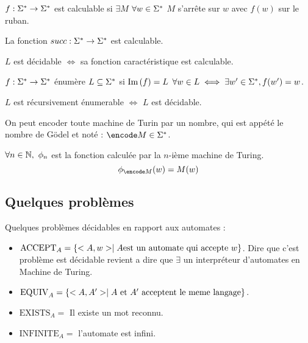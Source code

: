 \begin{definition}
	$f : \Sigma^{*} \to \Sigma^{*}$ est calculable si $\exists M$ \tq $\forall w \in \Sigma^{*}$ $M$ s'arrête sur $w$ avec $f(w)$ sur le ruban.
\end{definition}

\begin{lemme}
	La fonction $succ : \Sigma^{*} \to \Sigma^{*}$ est calculable.
\end{lemme}

\begin{prop}
	$L$ est décidable $\iff$ sa fonction caractéristique est calculable.
\end{prop}

\begin{definition}
	$f : \Sigma^{*} \to \Sigma^{*}$ énumère $L \subseteq \Sigma^{*}$ si $\text{Im}\left(f\right) = L$ \ie $\forall w \in L \iff \exists w' \in \Sigma^{*}, f (w') = w$.
\end{definition}

\begin{prop}
	$L$ est récursivement énumerable $\iff$ $L$ est décidable.
\end{prop}

On peut encoder toute machine de Turin par un nombre, qui est appété le nombre de Gödel et noté : $\encode M \in \mots$.

\begin{definition}
	$\forall n \in \mathbb{N}, \ \phi_n$ est la fonction calculée par la $n$-ième machine de Turing.
	$$\phi_{\encode M} (w) = M (w)$$
\end{definition}

\subsection{Quelques problèmes}

Quelques problèmes décidables en rapport aux automates :

\begin{itemize}
	\item $\text{ACCEPT}_A = \left\{<A,w> \mid A \text {est un automate qui accepte } w\right\}$.
	      Dire que c'est problème est décidable revient a dire que $\exists$ un interpréteur d'automates en Machine de Turing.
	\item $\text{EQUIV}_A = \left\{<A,A'> \mid A \text { et } A' \text{ acceptent le meme langage}\right\}$.
	\item $\text{EXISTS}_A = $ Il existe un mot reconnu.
	\item $\text{INFINITE}_A = $ l'automate est infini.
\end{itemize}

